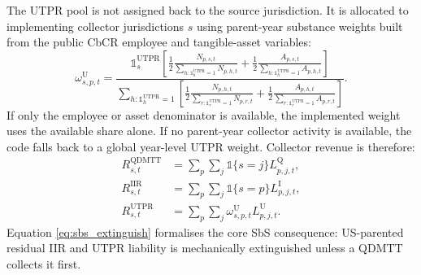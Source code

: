 \documentclass[11pt,a4paper]{article}
\begin{document}
The UTPR pool is not assigned back to the source jurisdiction. It is allocated to implementing collector jurisdictions $s$ using parent-year substance weights built from the public CbCR employee and tangible-asset variables:
\begin{equation}\label{eq:utpr_weight}
\omega_{s,p,t}^{\text{U}}
=
\frac{
\mathbb{1}_s^{\text{UTPR}}
\left[
\tfrac{1}{2}\frac{N_{p,s,t}}{\sum_{h:\mathbb{1}_h^{\text{UTPR}}=1}N_{p,h,t}}
+
\tfrac{1}{2}\frac{A_{p,s,t}}{\sum_{h:\mathbb{1}_h^{\text{UTPR}}=1}A_{p,h,t}}
\right]
}{
\sum_{h:\mathbb{1}_h^{\text{UTPR}}=1}
\left[
\tfrac{1}{2}\frac{N_{p,h,t}}{\sum_{r:\mathbb{1}_r^{\text{UTPR}}=1}N_{p,r,t}}
+
\tfrac{1}{2}\frac{A_{p,h,t}}{\sum_{r:\mathbb{1}_r^{\text{UTPR}}=1}A_{p,r,t}}
\right]
}.
\end{equation}
If only the employee or asset denominator is available, the implemented weight uses the available share alone. If no parent-year collector activity is available, the code falls back to a global year-level UTPR weight. Collector revenue is therefore:
\begin{align}
R_{s,t}^{\text{QDMTT}} &= \sum_p \sum_j \mathbb{1}\{s=j\}L_{p,j,t}^{\text{Q}}, \\
R_{s,t}^{\text{IIR}} &= \sum_p \sum_j \mathbb{1}\{s=p\}L_{p,j,t}^{\text{I}}, \\
R_{s,t}^{\text{UTPR}} &= \sum_p \sum_j \omega_{s,p,t}^{\text{U}}L_{p,j,t}^{\text{U}}.
\end{align}
Equation \eqref{eq:sbs_extinguish} formalises the core SbS consequence: US-parented residual IIR and UTPR liability is mechanically extinguished unless a QDMTT collects it first.
\end{document}
